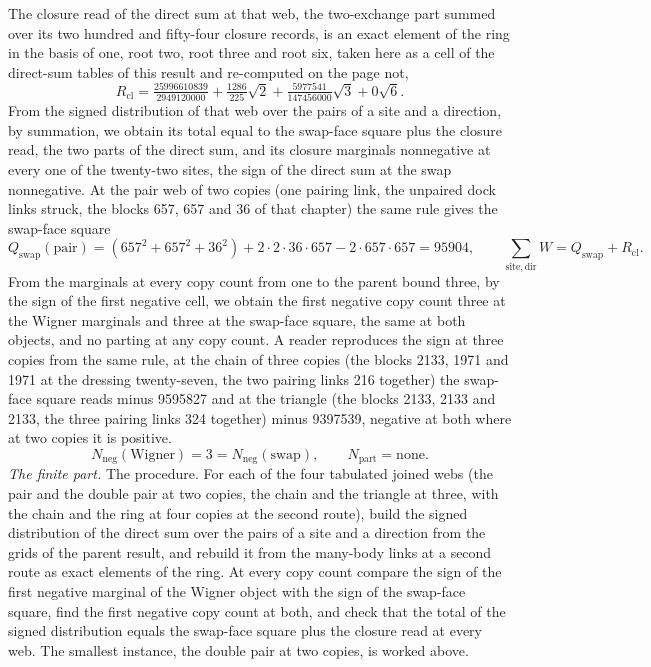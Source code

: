 \begin{chproof}
The closure read of the direct sum at that web, the two-exchange part summed over its two hundred and fifty-four closure records, is an exact element of the ring in the basis of one, root two, root three and root six, taken here as a cell of the direct-sum tables of this result and re-computed on the page not,
\begin{equation}
R_{\mathrm{cl}} = \tfrac{25996610839}{2949120000} + \tfrac{1286}{225}\sqrt{2} + \tfrac{5977541}{147456000}\sqrt{3} + 0\sqrt{6} .
\end{equation}
From the signed distribution of that web over the pairs of a site and a direction, by summation, we obtain its total equal to the swap-face square plus the closure read, the two parts of the direct sum, and its closure marginals nonnegative at every one of the twenty-two sites, the sign of the direct sum at the swap nonnegative. At the pair web of two copies (one pairing link, the unpaired dock links struck, the blocks 657, 657 and 36 of that chapter) the same rule gives the swap-face square
\begin{equation}
Q_{\mathrm{swap}}(\text{pair}) = (657^{2} + 657^{2} + 36^{2}) + 2 \cdot 2 \cdot 36 \cdot 657 - 2 \cdot 657 \cdot 657 = 95904, \qquad \sum_{\text{site},\,\text{dir}} W = Q_{\mathrm{swap}} + R_{\mathrm{cl}} .
\end{equation}
From the marginals at every copy count from one to the parent bound three, by the sign of the first negative cell, we obtain the first negative copy count three at the Wigner marginals and three at the swap-face square, the same at both objects, and no parting at any copy count. A reader reproduces the sign at three copies from the same rule, at the chain of three copies (the blocks 2133, 1971 and 1971 at the dressing twenty-seven, the two pairing links 216 together) the swap-face square reads minus 9595827 and at the triangle (the blocks 2133, 2133 and 2133, the three pairing links 324 together) minus 9397539, negative at both where at two copies it is positive.
\begin{equation}
N_{\mathrm{neg}}(\text{Wigner}) = 3 = N_{\mathrm{neg}}(\text{swap}), \qquad N_{\mathrm{part}} = \text{none} .
\end{equation}
\textit{The finite part.}
The procedure. For each of the four tabulated joined webs (the pair and the double pair at two copies, the chain and the triangle at three, with the chain and the ring at four copies at the second route), build the signed distribution of the direct sum over the pairs of a site and a direction from the grids of the parent result, and rebuild it from the many-body links at a second route as exact elements of the ring. At every copy count compare the sign of the first negative marginal of the Wigner object with the sign of the swap-face square, find the first negative copy count at both, and check that the total of the signed distribution equals the swap-face square plus the closure read at every web. The smallest instance, the double pair at two copies, is worked above.

\end{chproof}
